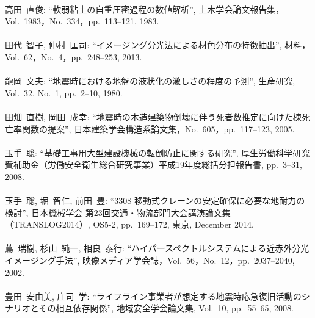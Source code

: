 \begin{mythebibliography}{}
\leavevmode \\高田~直俊:
\newblock ``軟弱粘土の自重圧密過程の数値解析'',
\newblock 土木学会論文報告集，Vol.~1983，No.~334，pp.~113--121, 1983.
\\

\leavevmode \\田代~智子, 仲村~匡司:
\newblock ``イメージング分光法による材色分布の特徴抽出'',
\newblock 材料，Vol.~62，No.~4，pp.~248--253, 2013.
\\

\leavevmode \\龍岡~文夫:
\newblock ``地震時における地盤の液状化の激しさの程度の予測'',
\newblock 	生産研究, Vol.~32, No.~1, pp.~2--10, 1980.
\\

\leavevmode \\田畑~直樹, 岡田~成幸:
\newblock ``地震時の木造建築物倒壊に伴う死者数推定に向けた棟死亡率関数の提案'',
\newblock 日本建築学会構造系論文集，No.~605，pp.~117--123, 2005.
\\

\leavevmode \\玉手~聡:
\newblock ``基礎工事用大型建設機械の転倒防止に関する研究'',
\newblock 厚生労働科学研究費補助金（労働安全衛生総合研究事業）平成19年度総括分担報告書, pp.~3--31, 2008.
\\

\leavevmode \\玉手~聡, 堀~智仁, 前田~豊:
\newblock ``3308 移動式クレーンの安定確保に必要な地耐力の検討'',
\newblock 日本機械学会 第23回交通・物流部門大会講演論文集（TRANSLOG2014）, OS5-2, pp.~169--172, 東京, December 2014.
\\

\leavevmode \\蔦~瑞樹, 杉山~純一, 相良~泰行:
\newblock ``ハイパースペクトルシステムによる近赤外分光イメージング手法'',
\newblock 映像メディア学会誌，Vol.~56，No.~12，pp.~2037--2040, 2002.
\\

\leavevmode \\豊田~安由美, 庄司~学:
\newblock ``ライフライン事業者が想定する地震時応急復旧活動のシナリオとその相互依存関係'',
\newblock 地域安全学会論文集, Vol.~10, pp.~55--65, 2008.
\\


\end{mythebibliography}
